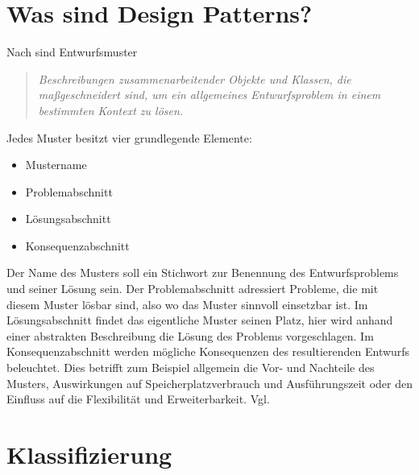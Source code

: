 \documentclass[fontsize=11pt,a4paper,final]{scrreprt}[2003/01/01]
\begin{document}
\section{Was sind Design Patterns?}\label{se:Was sind Design Patterns?}

Nach \cite[S. 4]{gamma2004} sind Entwurfsmuster 

\begin{quote}
	\textit{\glqq Beschreibungen zusammenarbeitender Objekte und Klassen, die maßgeschneidert sind, um ein allgemeines Entwurfsproblem in einem bestimmten Kontext zu lösen\grqq.}
\end{quote} 
\smallskip
Jedes Muster besitzt vier grundlegende Elemente:
\begin{itemize}
	\item Mustername
	\item Problemabschnitt
	\item Lösungsabschnitt
	\item Konsequenzabschnitt
\end{itemize}

Der Name des Musters soll ein Stichwort zur Benennung des Entwurfsproblems und seiner Lösung sein. Der Problemabschnitt adressiert Probleme, die mit diesem Muster lösbar sind, also wo das Muster sinnvoll einsetzbar ist. Im Lösungsabschnitt findet das eigentliche Muster seinen Platz, hier wird anhand einer abstrakten Beschreibung die Lösung des Problems vorgeschlagen. Im Konsequenzabschnitt werden mögliche Konsequenzen des resultierenden Entwurfs beleuchtet. Dies betrifft zum Beispiel allgemein die Vor- und Nachteile des Musters, Auswirkungen auf Speicherplatzverbrauch und Ausführungszeit oder den Einfluss auf die Flexibilität und Erweiterbarkeit. Vgl. \cite[S. 3 - 4]{gamma2004}

\section{Klassifizierung}\label{se:Klassifizierung}
\end{document}
